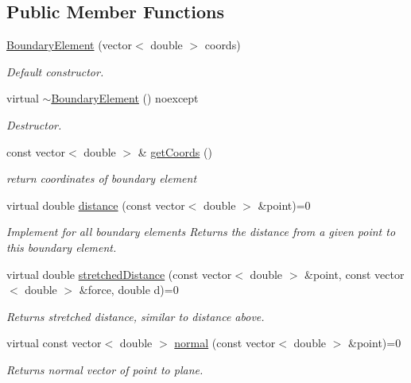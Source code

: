 \subsection*{Public Member Functions}
\begin{DoxyCompactItemize}
\item 
\hyperlink{classBoundaryElement_a51b203260855060fea195fa02b1cb07c}{Boundary\+Element} (vector$<$ double $>$ coords)
\begin{DoxyCompactList}\small\item\em Default constructor. \end{DoxyCompactList}\item 
virtual \hyperlink{classBoundaryElement_a4f0bec4466a42c311be8a3c1fc67cc52}{$\sim$\+Boundary\+Element} () noexcept
\begin{DoxyCompactList}\small\item\em Destructor. \end{DoxyCompactList}\item 
const vector$<$ double $>$ \& \hyperlink{classBoundaryElement_ace76817d750bb44c11edd918f1a8b78f}{get\+Coords} ()
\begin{DoxyCompactList}\small\item\em return coordinates of boundary element \end{DoxyCompactList}\item 
virtual double \hyperlink{classBoundaryElement_ac84f39882c9994b1f842c5be9a03db9d}{distance} (const vector$<$ double $>$ \&point)=0
\begin{DoxyCompactList}\small\item\em Implement for all boundary elements Returns the distance from a given point to this boundary element. \end{DoxyCompactList}\item 
virtual double \hyperlink{classBoundaryElement_a15e0453be158c2c9774b06f27bf6ae9b}{stretched\+Distance} (const vector$<$ double $>$ \&point, const vector$<$ double $>$ \&force, double d)=0
\begin{DoxyCompactList}\small\item\em Returns stretched distance, similar to distance above. \end{DoxyCompactList}\item 
virtual const vector$<$ double $>$ \hyperlink{classBoundaryElement_aef0aa594a42167a34efbc757b47eb012}{normal} (const vector$<$ double $>$ \&point)=0
\begin{DoxyCompactList}\small\item\em Returns normal vector of point to plane. \end{DoxyCompactList}\end{DoxyCompactItemize}
